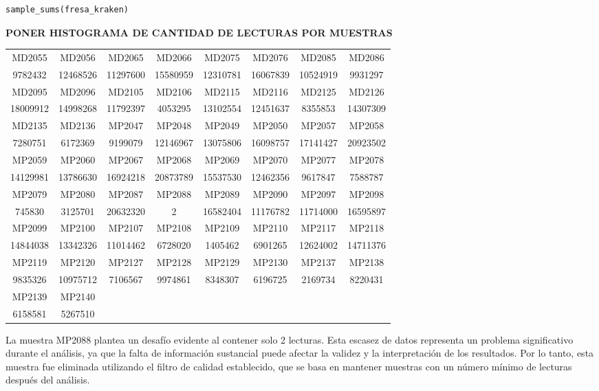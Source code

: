 \begin{lstlisting}[basicstyle=\small] 
sample_sums(fresa_kraken)
\end{lstlisting}

\textbf{PONER HISTOGRAMA DE CANTIDAD DE LECTURAS POR MUESTRAS}

\resizebox{0.9\textwidth}{!} {
\begin{tabular}{ c c c c c c c c }
MD2055 & MD2056 & MD2065 & MD2066 & MD2075 & MD2076 & MD2085 & MD2086 \\
9782432 & 12468526 & 11297600 & 15580959 & 12310781 & 16067839 & 10524919 & 9931297 \\
MD2095 & MD2096 & MD2105 & MD2106 & MD2115 & MD2116 & MD2125 & MD2126 \\
18009912 & 14998268 & 11792397 & 4053295 & 13102554 & 12451637 & 8355853 & 14307309 \\
MD2135 & MD2136 & MP2047 & MP2048 & MP2049 & MP2050 & MP2057 & MP2058 \\
7280751 & 6172369 & 9199079 & 12146967 & 13075806 & 16098757 & 17141427 & 20923502 \\
MP2059 & MP2060 & MP2067 & MP2068 & MP2069 & MP2070 & MP2077 & MP2078 \\
14129981 & 13786630 & 16924218 & 20873789 & 15537530 & 12462356 & 9617847 & 7588787 \\
MP2079 & MP2080 & MP2087 & MP2088 & MP2089 & MP2090 & MP2097 & MP2098 \\
745830 & 3125701 & 20632320 & 2 & 16582404 & 11176782 & 11714000 & 16595897 \\
MP2099 & MP2100 & MP2107 & MP2108 & MP2109 & MP2110 & MP2117 & MP2118 \\
14844038 & 13342326 & 11014462 & 6728020 & 1405462 & 6901265 & 12624002 & 14711376 \\
MP2119 & MP2120 & MP2127 & MP2128 & MP2129 & MP2130 & MP2137 & MP2138 \\
9835326 & 10975712 & 7106567 & 9974861 & 8348307 & 6196725 & 2169734 & 8220431 \\
MP2139 & MP2140 \\
6158581 & 5267510
\end{tabular}
}

La muestra MP2088 plantea un desafío evidente al contener solo 2 lecturas. Esta escasez de datos representa un problema significativo durante el análisis, ya que la falta de información sustancial puede afectar la validez y la interpretación de los resultados. Por lo tanto, esta muestra fue eliminada utilizando el filtro de calidad establecido, que se basa en mantener muestras con un número mínimo de lecturas después del análisis.\\

